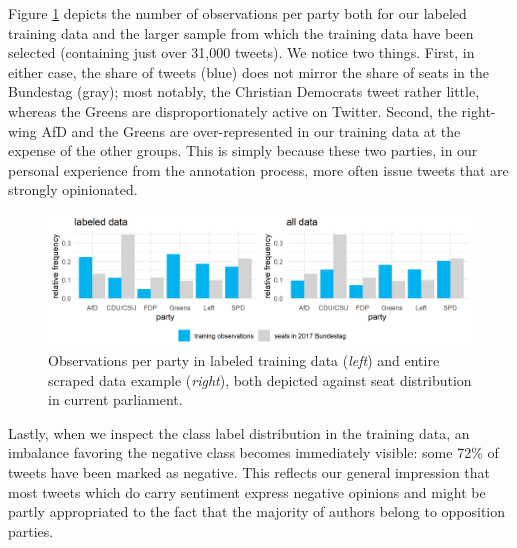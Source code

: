 Figure \ref{fig_obs_party} depicts the number of observations per party both 
for our labeled training data and the larger sample from which the training data 
have been selected (containing just over 31,000 tweets).
We notice two things.
First, in either case, the share of tweets (blue) does 
not mirror the share of seats in the Bundestag (gray); most notably, the 
Christian Democrats tweet rather little, whereas the Greens are 
disproportionately active on Twitter.
Second, the right-wing AfD and the Greens are over-represented in our training 
data at the expense of the other groups.
This is simply because these two parties, in our personal experience from the
annotation process, more often issue tweets that are strongly opinionated.

\begin{figure}[H]
  \includegraphics[width = \textwidth]{figures/obs_per_party}
\caption[Training data: observations per party]
{Observations per party in labeled training data (\textit{left}) and entire 
scraped data example (\textit{right}), both depicted against seat distribution 
in current parliament.}
\label{fig_obs_party}
\end{figure}

Lastly, when we inspect the class label distribution in the training data,
an imbalance favoring the negative class becomes immediately visible: some 
72\% of tweets have been marked as negative.
This reflects our general impression that most tweets which do carry sentiment 
express negative opinions and might be partly appropriated to the fact that 
the majority of authors belong to opposition parties.


